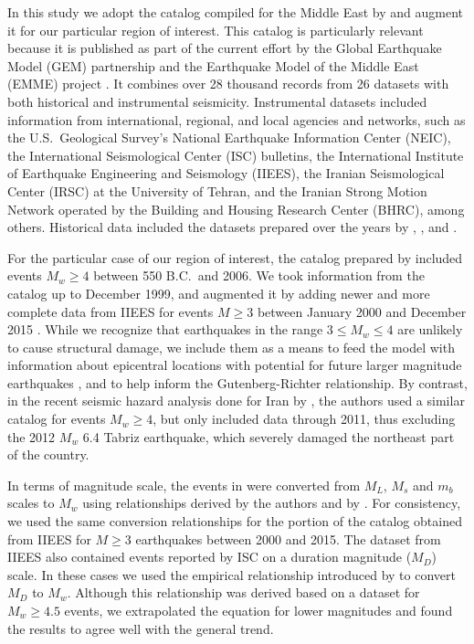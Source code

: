 In this study we adopt the catalog compiled for the Middle East by \citet{Zare2014} and augment it for our particular region of interest. This catalog is particularly relevant because it is published as part of the current effort by the Global Earthquake Model (GEM) partnership and the Earthquake Model of the Middle East (EMME) project \citep[as mentioned in][]{Zare2014}. It combines over 28 thousand records from 26 datasets with both historical and instrumental seismicity. Instrumental datasets included information from international, regional, and local agencies and networks, such as the U.S.~Geological Survey's National Earthquake Information Center (NEIC), the International Seismological Center (ISC) bulletins, the International Institute of Earthquake Engineering and Seismology (IIEES), the Iranian Seismological Center (IRSC) at the University of Tehran, and the Iranian Strong Motion Network operated by the Building and Housing Research Center (BHRC), among others. Historical data included the datasets prepared over the years by \citet{Ambraseys_1982_Book}, \citet{Ambraseys_2005_Book}, and \citet{Ambraseys_2009_Book}.

For the particular case of our region of interest, the catalog prepared by \citet{Zare2014} included events $M_w \geq 4$ between 550 B.C.~and 2006. We took information from the catalog up to December 1999, and augmented it by adding newer and more complete data from IIEES for events $M \geq 3$ between January 2000 and December 2015 . While we recognize that earthquakes in the range $3 \leq M_w \leq 4$ are unlikely to cause structural damage, we include them as a means to feed the model with information about epicentral locations with potential for future larger magnitude earthquakes \citep{Kafka_2000_BSSA}, and to help inform the Guten\-berg-Richter relationship. By contrast, in the recent seismic hazard analysis done for Iran by \citet{Khodaverdian_2016_BSSA}, the authors used a similar catalog for events $M_w \geq 4$, but only included data through 2011, thus excluding the 2012 $M_w$ 6.4 Tabriz earthquake, which severely damaged the northeast part of the country.

In terms of magnitude scale, the events in \citet{Zare2014} were converted from $M_L$, $M_s$ and $m_b$ scales to $M_w$ using relationships derived by the authors and by \citet{Escordilis_2006_JS}. For consistency, we used the same conversion relationships for the portion of the catalog obtained from IIEES for $M \geq 3$ earthquakes between 2000 and 2015. The dataset from IIEES also contained events reported by ISC on a duration magnitude ($M_D$) scale. In these cases we used the empirical relationship introduced by \citet{Deniz2010} to convert $M_D$ to $M_w$. Although this relationship was derived based on a dataset for $M_w \geq 4.5$ events, we extrapolated the equation for lower magnitudes and found the results to agree well with the general trend.

